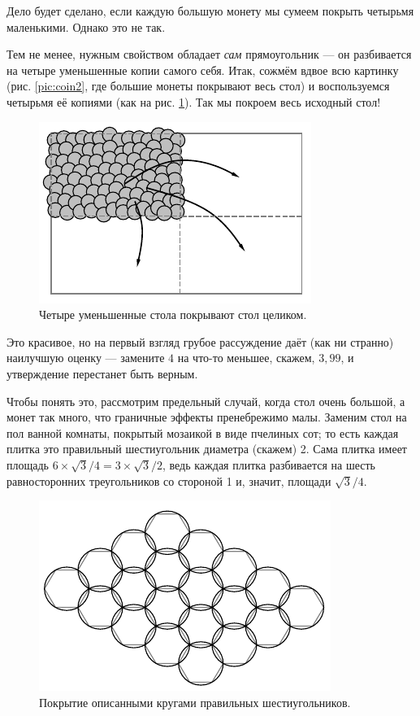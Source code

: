 Дело будет сделано, если каждую большую монету мы сумеем покрыть четырьмя маленькими. Однако это не так.

Тем не менее, нужным свойством обладает \emph{сам} прямоугольник --- он разбивается на четыре уменьшенные копии самого себя.
Итак, сожмём вдвое всю картинку (рис. \ref{pic:coin2}, где большие монеты покрывают весь стол) и воспользуемся четырьмя её копиями (как на рис. \ref{pic:coin3}).
Так мы покроем весь исходный стол!


\begin{figure}[t!]
\centering
\includegraphics[scale=1]{pics/coin3}
\caption{Четыре уменьшенные стола покрывают стол целиком.}
\label{pic:coin3}
\end{figure}

\medskip

Это красивое, но на первый взгляд грубое рассуждение даёт (как ни странно) наилучшую оценку --- замените $4$ на что-то меньшее, скажем, $3{,}99$, и утверждение перестанет быть верным.

Чтобы понять это, рассмотрим предельный случай, когда стол очень большой, а монет так много, что граничные эффекты пренебрежимо малы.
Заменим стол на пол ванной комнаты, покрытый мозаикой в виде пчелиных сот;
то есть каждая плитка это правильный шестиугольник диаметра (скажем) 2.
Сама плитка имеет площадь $6\times\sqrt{3}/4=3\times\sqrt{3}/2$, ведь каждая плитка разбивается на шесть равносторонних треугольников со стороной 1 и, значит, площади $\sqrt{3}/4$.

\begin{figure}[t!]
\centering
\includegraphics[scale=1]{pics/coin4}
\caption{Покрытие описанными кругами правильных шестиугольников.}
\label{pic:coin4}
\end{figure}

